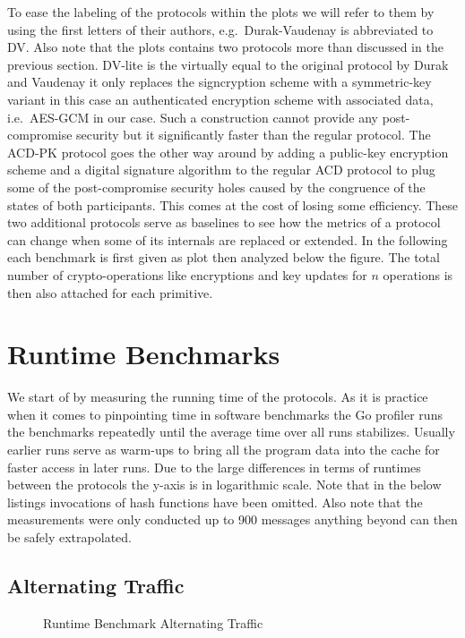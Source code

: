 \documentclass[11pt,a4paper,twoside,openright,bibliography=totoc]{scrbook}
\begin{document}
To ease the labeling of the protocols within the plots we will
refer to them by using the first letters of their authors,
e.g.~Durak-Vaudenay is abbreviated to DV. Also note that
the plots contains two protocols more than discussed in
the previous section. DV-lite is the virtually equal to
the original protocol by Durak and Vaudenay it only replaces
the signcryption scheme with a symmetric-key variant in
this case an authenticated encryption scheme with associated
data, i.e.~AES-GCM in our case. Such a construction cannot provide
any post-compromise security but it significantly faster
than the regular protocol. The ACD-PK protocol goes the other way around
by adding a public-key encryption scheme and a digital signature
algorithm to the regular ACD protocol to plug some
of the post-compromise security holes caused by
the congruence of the states of both participants.
This comes at the cost of losing some efficiency.
These two additional protocols serve as baselines
to see how the metrics of a protocol can change when
some of its internals are replaced or extended. In the
following each benchmark is first given as plot then
analyzed below the figure.
The total number of
crypto-operations like encryptions and key updates
for $n$ operations is then also attached for each
primitive.

\section{Runtime Benchmarks}
\label{sec:runtime-benchmarks}

We start of by measuring the running time of the protocols. As
it is practice when it comes to pinpointing time in software
benchmarks the Go profiler runs the benchmarks repeatedly
until the average time over all runs stabilizes. Usually
earlier runs serve as warm-ups to bring all the program
data into the cache for faster access in later runs.
Due to the large differences in terms
of runtimes between the protocols the y-axis is
in logarithmic scale.
Note that in the below listings invocations of
hash functions have been omitted.
Also note that the measurements were only conducted up
to 900 messages anything beyond can then be safely extrapolated.

\subsection{Alternating Traffic}
\label{sec:alternating-traffic}

\begin{figure}[H]
  \centering
   
  \caption{Runtime Benchmark Alternating Traffic}
  \label{fig:time-alt}
\end{figure}
\end{document}
